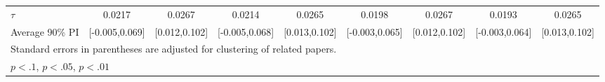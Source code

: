 \begin{table}[htbp]
\begin{tabular}{l*{8}{c}}
$\tau$      &      0.0217         &      0.0267         &      0.0214         &      0.0265         &      0.0198         &      0.0267         &      0.0193         &      0.0265         \\
Average 90\% PI&[-0.005,0.069]         &[0.012,0.102]         &[-0.005,0.068]         &[0.013,0.102]         &[-0.003,0.065]         &[0.012,0.102]         &[-0.003,0.064]         &[0.013,0.102]         \\
\hline\hline
\multicolumn{9}{l}{\footnotesize Standard errors in parentheses are adjusted for clustering of related papers.}\\
\multicolumn{9}{l}{\footnotesize \footnotesize \sym{*} \(p<.1\), \sym{**} \(p<.05\), \sym{***} \(p<.01\)}\\
\end{tabular}
\end{table}
